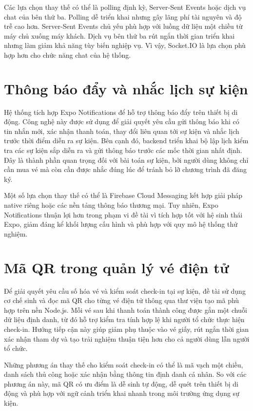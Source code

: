 \documentclass[../DoAn.tex]{subfiles}
\begin{document}
Các lựa chọn thay thế có thể là polling định kỳ, Server-Sent Events hoặc dịch vụ chat của bên thứ ba. Polling dễ triển khai nhưng gây lãng phí tài nguyên và độ trễ cao hơn. Server-Sent Events chủ yếu phù hợp với luồng dữ liệu một chiều từ máy chủ xuống máy khách. Dịch vụ bên thứ ba rút ngắn thời gian triển khai nhưng làm giảm khả năng tùy biến nghiệp vụ. Vì vậy, Socket.IO là lựa chọn phù hợp hơn cho chức năng chat của hệ thống.

\section{Thông báo đẩy và nhắc lịch sự kiện}
Hệ thống tích hợp Expo Notifications để hỗ trợ thông báo đẩy trên thiết bị di động. Công nghệ này được sử dụng để giải quyết yêu cầu gửi thông báo khi có tin nhắn mới, xác nhận thanh toán, thay đổi liên quan tới sự kiện và nhắc lịch trước thời điểm diễn ra sự kiện. Bên cạnh đó, backend triển khai bộ lập lịch kiểm tra các sự kiện sắp diễn ra và gửi thông báo trước các mốc thời gian nhất định. Đây là thành phần quan trọng đối với bài toán sự kiện, bởi người dùng không chỉ cần mua vé mà còn cần được nhắc đúng lúc để tránh bỏ lỡ chương trình đã đăng ký.

Một số lựa chọn thay thế có thể là Firebase Cloud Messaging kết hợp giải pháp native riêng hoặc các nền tảng thông báo thương mại. Tuy nhiên, Expo Notifications thuận lợi hơn trong phạm vi đề tài vì tích hợp tốt với hệ sinh thái Expo, giảm đáng kể khối lượng cấu hình và phù hợp với quy mô hệ thống thử nghiệm.

\section{Mã QR trong quản lý vé điện tử}
Để giải quyết yêu cầu số hóa vé và kiểm soát check-in tại sự kiện, đề tài sử dụng cơ chế sinh và đọc mã \gls{QR} cho từng vé điện tử thông qua thư viện tạo mã phù hợp trên nền Node.js. Mỗi vé sau khi thanh toán thành công được gắn một chuỗi dữ liệu định danh, từ đó hỗ trợ kiểm tra tính hợp lệ khi người tổ chức thực hiện check-in. Hướng tiếp cận này giúp giảm phụ thuộc vào vé giấy, rút ngắn thời gian xác nhận tham dự và tạo trải nghiệm thuận tiện hơn cho cả người dùng lẫn người tổ chức.

Những phương án thay thế cho kiểm soát check-in có thể là mã vạch một chiều, danh sách thủ công hoặc xác nhận bằng thông tin định danh cá nhân. So với các phương án này, mã QR có ưu điểm là dễ sinh tự động, dễ quét trên thiết bị di động và phù hợp với ngữ cảnh triển khai nhanh trong môi trường ứng dụng sự kiện.
\end{document}
